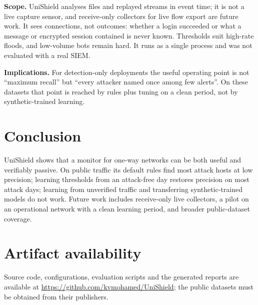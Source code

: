 \documentclass[conference]{IEEEtran}
\begin{document}
\textbf{Scope.} UniShield analyses files and replayed streams in event time; it is not a live capture sensor, and receive-only collectors for live flow export are future work. It sees connections, not outcomes: whether a login succeeded or what a message or encrypted session contained is never known. Thresholds suit high-rate floods, and low-volume bots remain hard. It runs as a single process and was not evaluated with a real SIEM.

\textbf{Implications.} For detection-only deployments the useful operating point is not ``maximum recall'' but ``every attacker named once among few alerts''. On these datasets that point is reached by rules plus tuning on a clean period, not by synthetic-trained learning.

\section{Conclusion}
UniShield shows that a monitor for one-way networks can be both useful and verifiably passive. On public traffic its default rules find most attack hosts at low precision; learning thresholds from an attack-free day restores precision on most attack days; learning from unverified traffic and transferring synthetic-trained models do not work. Future work includes receive-only live collectors, a pilot on an operational network with a clean learning period, and broader public-dataset coverage.

\section*{Artifact availability}
Source code, configurations, evaluation scripts and the generated reports are available at \url{https://github.com/kvmohamed/UniShield}; the public datasets must be obtained from their publishers.



\end{document}
